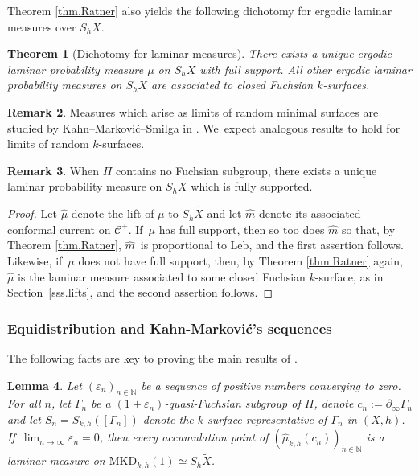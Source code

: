 \documentclass[10pt]{amsart}
\newcommand{\ksurface}{$k$\nobreakdash-surface\xspace}
\newcommand{\ksurfaces}{$k$\nobreakdash-surfaces\xspace}
\theoremstyle{plain}
\newtheorem{theorem}{Theorem}[section]
\newtheorem{lemma}[theorem]{Lemma}
\theoremstyle{definition}
\newtheorem{remark}[theorem]{Remark}
\newcommand{\cC}{{\mathcal C}}
\let\eps\varepsilon
\newcommand{\Leb}{\mathrm{Leb}}
\newcommand{\MKD}{\mathrm{MKD}}
\newcommand{\bord}{\partial_{\infty}}
\begin{document}
Theorem \ref{thm.Ratner} also yields the following dichotomy for ergodic laminar measures over $S_hX$.

\begin{theorem}[Dichotomy for laminar measures]\label{thm.dichotomy_laminar} There exists a unique ergodic laminar probability measure $\mu$ on $S_hX$ with full support. All other ergodic laminar probability measures on $S_hX$ are associated to closed Fuchsian \ksurfaces.
\end{theorem}

\begin{remark}
Measures which arise as limits of random minimal surfaces are studied by Kahn--Markovi\'c--Smilga in \cite{KMS}. We~expect analogous results to hold for limits of random \ksurfaces.
\end{remark}

\begin{remark}
When $\Pi$ contains no Fuchsian subgroup, there exists a unique laminar probability measure on $S_hX$ which is fully supported.
\end{remark}

\begin{proof}
Let $\hat\mu$ denote the lift of $\mu$ to $S_h\tilde{X}$ and let $\hat m$ denote its associated conformal current on $\cC^+$. If~$\mu$ has full support, then so too does $\hat m$ so that, by Theorem \ref{thm.Ratner}, $\hat m$~is proportional to $\Leb$, and the first assertion follows. Likewise, if~$\mu$ does not have full support, then, by Theorem \ref{thm.Ratner} again, $\hat\mu$ is the laminar measure associated to some closed Fuchsian \ksurface, as in Section~\ref{sss.lifts}, and the second assertion follows.
\end{proof}

\subsubsection{Equidistribution and Kahn-Markovi\'c's sequences} The following facts are key to proving the main results of \cite{ALS}.

\begin{lemma}\label{lem.conv_fuchsian}
Let $(\eps_n)_{n\in\mathbb{N}}$ be a sequence of positive numbers converging to zero. For all $n$, let $\Gamma_n$ be a $(1+\eps_n)$-quasi-Fuchsian subgroup of $\Pi$, denote $c_n:=\bord\Gamma_n$ and let $S_n=S_{k,h}([\Gamma_n])$ denote the \ksurface representative of $\Gamma_n$ in $(X,h)$. If~$\lim_{n\to\infty}\eps_n=0$, then every accumulation point of $(\hat\mu_{k,h}(c_n))_{n\in\mathbb{N}}$ is a laminar measure on $\MKD_{k,h}(1)\simeq S_{h}\tilde{X}$.
\end{lemma}
\end{document}
